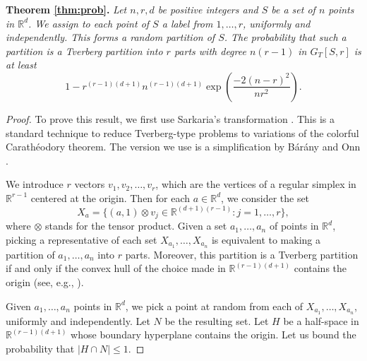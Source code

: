 \documentclass[11pt,a4paper]{article}
\theoremstyle{plain}
\theoremstyle{definition}
\newcommand{\rr}{\mathds{R}}
\begin{document}
\medskip
\noindent\textbf{Theorem \ref{thm:prob}.} 
\emph{Let $n,r,d$ be positive integers and $S$ be a set of $n$ points in $\rr^d$.  We assign to each point of $S$ a label from $1,\dots, r$, uniformly and independently.  This forms a random partition of $S$.  The probability that such a partition is a Tverberg partition into $r$ parts with degree $n(r-1)$ in $G_T[S,r]$ is at least
    \[
1- r^{(r-1)(d+1)}n^{(r-1)(d+1)}\exp\left(\frac{-2(n-r)^2}{nr^2}\right).
    \]
}
\begin{proof}
    To prove this result, we first use Sarkaria's transformation \cite{Sarkaria:1992vt}.  This is a standard technique to reduce Tverberg-type problems to variations of the colorful Carath\'eodory theorem.  The version we use is a simplification by B\'ar\'any and Onn \cite{Barany:1995tg}.

    We introduce $r$ vectors $v_1, v_2, \dots, v_r$, which are the vertices of a regular simplex in $\rr^{r-1}$ centered at the origin.  Then for each $a \in \rr^d$, we consider the set
    \[
    X_a = \{(a,1) \otimes v_j \in \rr^{(d+1)(r-1)} \colon j =1,\dots, r\},
    \]
    where $\otimes$ stands for the tensor product.  Given a set $a_1, \dots, a_n$ of points in $\rr^d$, picking a representative of each set $X_{a_1}, \dots, X_{a_n}$ is equivalent to making a partition of $a_1, \dots, a_n$ into $r$ parts.  Moreover, this partition is a Tverberg partition if and only if the convex hull of the choice made in $\rr^{(r-1)(d+1)}$ contains the origin (see, e.g., \cite{Barany:2018fy}).

    Given $a_1, \dots, a_n$ points in $\rr^d$, we pick a point at random from each of $X_{a_1}, \dots, X_{a_n}$, uniformly and independently.  Let $N$ be the resulting set.  Let $H$ be a half-space in $\rr^{(r-1)(d+1)}$ whose boundary hyperplane contains the origin.  Let us bound the probability that $|H\cap N| \le 1$.


\end{proof}
\end{document}
